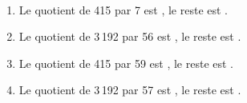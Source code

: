    \ \\ [-5mm]
   \begin{enumerate}
      \item Le quotient de 415 par 7 est {}, le reste est {}.
      \item Le quotient de 3\,192 par 56 est {}, le reste est {}.
      \item Le quotient de 415 par 59 est {}, le reste est {}.
      \item Le quotient de 3\,192 par 57 est {}, le reste est {}.
   \end{enumerate}
